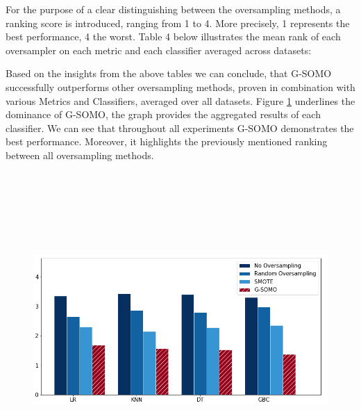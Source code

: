 \documentclass[parskip=full]{scrartcl}
\begin{document}
For the purpose of a clear distinguishing between the oversampling methods, a
ranking score is introduced, ranging from 1 to 4. More precisely, 1 represents
the best performance, 4 the worst. Table 4 below illustrates the mean rank of
each oversampler on each metric and each classifier averaged across datasets: 


Based on the insights from the above tables we can conclude, that G-SOMO successfully
outperforms other oversampling methods, proven in combination with various
Metrics and Classifiers, averaged over all datasets. Figure
\ref{fig:MeanRanking} underlines the dominance of G-SOMO, the graph provides the
aggregated results of each classifier. We can see that throughout all
experiments G-SOMO demonstrates the best performance. Moreover, it highlights
the previously mentioned ranking between all oversampling methods. 

\begin{figure}[H]
	\centering
	\includegraphics[width=15cm,height=12cm, keepaspectratio]{./resources/fig7.png}
	\label{fig:MeanRanking}
\end{figure}
\end{document}

